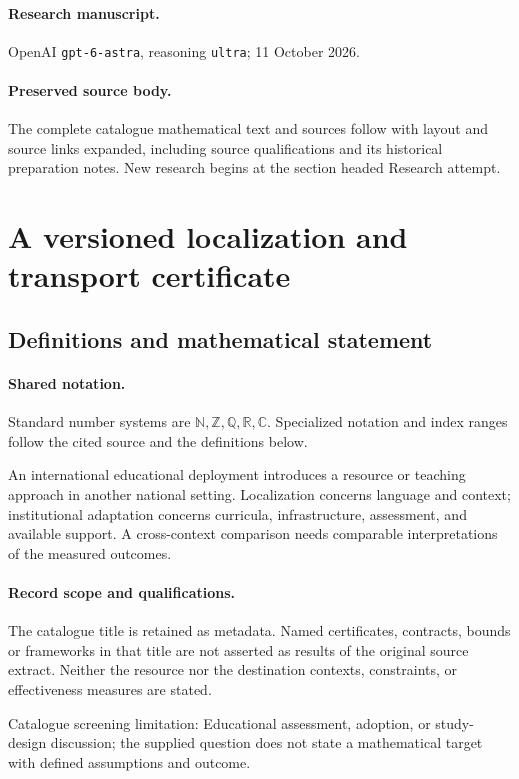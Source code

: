 \documentclass[11pt]{article}
\begin{document}
\paragraph{Research manuscript.} OpenAI \texttt{gpt-6-astra}, reasoning \texttt{ultra}; 11 October 2026.
\paragraph{Preserved source body.} The complete catalogue mathematical text and sources follow with layout and source links expanded, including source qualifications and its historical preparation notes. New research begins at the section headed Research attempt.

\section{A versioned localization and transport certificate}\label{statement}

\subsection{Definitions and mathematical statement}

\paragraph{Shared notation.}Standard number systems are $\mathbb N,\mathbb Z,\mathbb Q,\mathbb R,\mathbb C$. Specialized notation and index ranges follow the cited source and the definitions below.


An international educational deployment introduces a resource or teaching approach in another national setting. Localization concerns language and context; institutional adaptation concerns curricula, infrastructure, assessment, and available support. A cross-context comparison needs comparable interpretations of the measured outcomes.
\paragraph{Record scope and qualifications.}
The catalogue title is retained as metadata. Named certificates, contracts, bounds or frameworks in that title are not asserted as results of the original source extract.
Neither the resource nor the destination contexts, constraints, or effectiveness measures are stated.

Catalogue screening limitation: Educational assessment, adoption, or study-design discussion; the supplied question does not state a mathematical target with defined assumptions and outcome.
\end{document}
